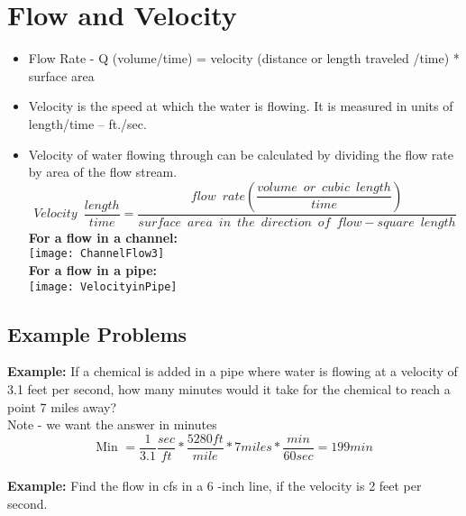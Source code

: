 \section{Flow and Velocity}
\begin{itemize}
\item Flow Rate - Q (volume/time) = velocity (distance or length traveled /time) * surface area
\item Velocity is the speed at which the water is flowing.  It is measured in units of length/time – ft./sec.
\item Velocity of water flowing through can be calculated by dividing the flow rate by area of the flow stream.\\
\vspace{0.5cm}
$$Velocity \enspace \dfrac{length}{time}= \dfrac{flow \enspace rate(\dfrac{volume \enspace or \enspace cubic \enspace length}{time})}{surface \enspace area \enspace in \enspace the \enspace direction \enspace of \enspace flow-square \enspace length}$$
\vspace{0.5cm}
\textbf{For a flow in a channel:}\\
\vspace{0.5cm}
\texttt{[image: ChannelFlow3]}\\

\textbf{For a flow in a pipe:}\\
\vspace{0.5cm}
\texttt{[image: VelocityinPipe]}\\
\vspace{0.5cm}
\end{itemize}
\subsection*{Example Problems}
\textbf{Example:} If a chemical is added in a pipe where water is flowing at a velocity of 3.1 feet per second, how many minutes would it take for the chemical to reach a point 7 miles away?  \\

Note - we want the answer in minutes\\

$$\textrm{Min } = \dfrac{1}{3.1}\dfrac{sec}{ft}*\dfrac{5280ft}{mile}*7 miles*\dfrac{min}{60 sec} = \boxed{199 min}$$
\\

\textbf{Example:} Find the flow in cfs in a 6 -inch line, if the velocity is 2 feet per second.

